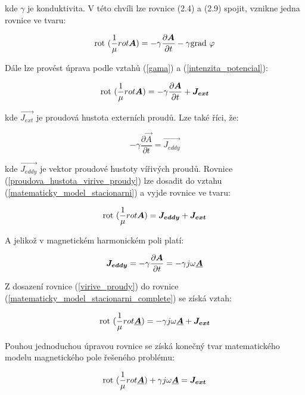 kde $\gamma$ je konduktivita. V této chvíli lze rovnice (2.4) a (2.9) spojit, vznikne jedna rovnice ve tvaru:

\begin{equation}
	\mathrm{rot}\  (\frac{1}{\mu} {rot \mbox{\boldmath$A$}}) = - \gamma \frac{\partial \mbox{\boldmath$A$}}{\partial t} - \gamma \mathrm{grad}\ {\varphi}
\end{equation}

Dále lze provést úprava podle vztahů (\ref{gama}) a (\ref{intenzita_potencial}):

\begin{equation}
	\mathrm{rot}\  (\frac{1}{\mu} {rot \mbox{\boldmath$A$}}) = - \gamma \frac{\partial \mbox{\boldmath$A$}}{\partial t} + \mbox{\boldmath$J_{ext}$}
	\label{matematicky_model_stacionarni}
\end{equation}

kde $\vec{J_{ext}}$ je proudová hustota externích proudů. Lze také říci, že:

\begin{equation}
	- \gamma \frac{\partial \vec{A}}{\partial t} = \vec{J_{eddy}}
	\label{proudova_hustota_virive_proudy}
\end{equation}

kde $\vec{J_{eddy}}$ je vektor proudové hustoty vířivých proudů. Rovnice (\ref{proudova_hustota_virive_proudy}) lze dosadit do vztahu (\ref{matematicky_model_stacionarni}) a vyjde rovnice ve tvaru:

\begin{equation}
	\mathrm{rot}\  (\frac{1}{\mu} {rot \mbox{\boldmath$A$}}) = \mbox{\boldmath$J_{eddy}$} + \mbox{\boldmath$J_{ext}$}
	\label{matematicky_model_stacionarni_complete}
\end{equation}

A jelikož v magnetickém harmonickém poli platí:

\begin{equation}
	\mbox{\boldmath$J_{eddy}$} = - \gamma \frac{\partial \mbox{\boldmath$A$}}{\partial t} = - \gamma j \omega \mbox{\underline{\boldmath$A$}}
	\label{virive_proudy}
\end{equation}

Z dosazení rovnice (\ref{virive_proudy}) do rovnice (\ref{matematicky_model_stacionarni_complete}) se získá vztah:

\begin{equation}
	\mathrm{rot}\  (\frac{1}{\mu} {rot \mbox{\underline{\boldmath$A$}}}) = - \gamma j \omega \mbox{\underline{\boldmath$A$}} + \mbox{\boldmath$J_{ext}$}
\end{equation}

Pouhou jednoduchou úpravou rovnice se získá konečný tvar matematického modelu magnetického pole řešeného problému:

\begin{equation}
	\mathrm{rot}\  (\frac{1}{\mu} {rot \mbox{\underline{\boldmath$A$}}}) + \gamma j \omega \mbox{\underline{\boldmath$A$}} = \mbox{\boldmath$J_{ext}$}
	\label{matematicky_model_magneticke_pole}
\end{equation}